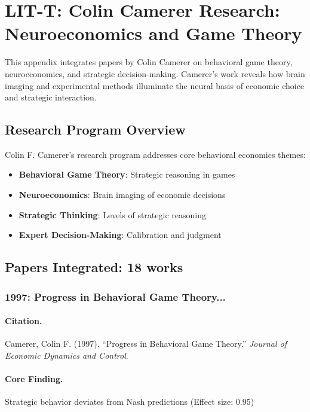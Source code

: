 \section{LIT-T: Colin Camerer Research: Neuroeconomics and Game Theory}
\label{app:litt}

This appendix integrates papers by Colin Camerer on behavioral game theory,
neuroeconomics, and strategic decision-making. Camerer's work reveals how brain imaging and
experimental methods illuminate the neural basis of economic choice and strategic interaction.

\subsection{Research Program Overview}

Colin F. Camerer's research program addresses core behavioral economics themes:

\begin{itemize}
  \item \textbf{Behavioral Game Theory}: Strategic reasoning in games
  \item \textbf{Neuroeconomics}: Brain imaging of economic decisions
  \item \textbf{Strategic Thinking}: Levels of strategic reasoning
  \item \textbf{Expert Decision-Making}: Calibration and judgment
\end{itemize}

\subsection{Papers Integrated: 18 works}

\subsubsection{1997: Progress in Behavioral Game Theory...}

\paragraph{Citation.}
Camerer, Colin F. (1997). ``Progress in Behavioral Game Theory.''
\textit{Journal of Economic Dynamics and Control}.

\paragraph{Core Finding.}
Strategic behavior deviates from Nash predictions (Effect size: 0.95)

